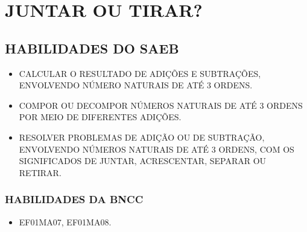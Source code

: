 \chapter{JUNTAR OU TIRAR?}


\section*{HABILIDADES DO SAEB}

\begin{itemize}
\item \uppercase{Calcular o resultado de adições e subtrações, envolvendo número
naturais de até 3 ordens.}

\item \uppercase{Compor ou decompor números naturais de até 3 ordens por meio de
diferentes adições.}

\item \uppercase{Resolver problemas de adição ou de subtração, envolvendo números
naturais de até 3 ordens, com os significados de juntar, acrescentar,
separar ou retirar.}
\end{itemize}

\subsection{HABILIDADES DA BNCC}

\begin{itemize}
\item EF01MA07, EF01MA08.
\end{itemize}

